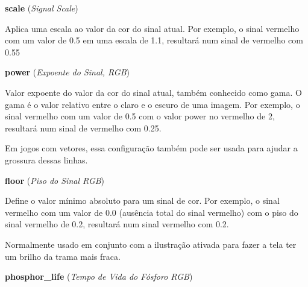 \documentclass[letterpaper,10pt,brazil]{sphinxmanual}
\begin{document}
\begin{DUlineblock}{0em}
\item[] \textbf{scale} (\emph{Signal Scale})
\item[] 
\item[]
\begin{DUlineblock}{\DUlineblockindent}
\item[] Aplica uma escala ao valor da cor do sinal atual. Por exemplo, o sinal vermelho com um valor de 0.5 em uma escala de 1.1, resultará num sinal de vermelho com 0.55
\item[] 
\end{DUlineblock}
\item[] \textbf{power} (\emph{Expoente do Sinal, RGB})
\item[] 
\item[]
\begin{DUlineblock}{\DUlineblockindent}
\item[] Valor expoente do valor da cor do sinal atual, também conhecido como gama. O gama é o valor relativo entre o claro e o escuro de uma imagem. Por exemplo, o sinal vermelho com um valor de 0.5 com o valor power no vermelho de 2, resultará num sinal de vermelho com 0.25.
\item[] 
\item[] Em jogos com vetores, essa configuração também pode ser usada para ajudar a grossura dessas linhas.
\item[] 
\end{DUlineblock}
\item[] \textbf{floor} (\emph{Piso do Sinal RGB})
\item[] 
\item[]
\begin{DUlineblock}{\DUlineblockindent}
\item[] Define o valor mínimo absoluto para um sinal de cor. Por exemplo, o sinal vermelho com um valor de 0.0 (ausência total do sinal vermelho) com o piso do sinal vermelho de 0.2, resultará num sinal vermelho com 0.2.
\item[] 
\item[] Normalmente usado em conjunto com a ilustração ativada para fazer a tela ter um brilho da trama mais fraca.
\item[] 
\end{DUlineblock}
\item[] \textbf{phosphor\_life} (\emph{Tempo de Vida do Fósforo RGB})
\item[] 
\item[]
\begin{DUlineblock}{\DUlineblockindent}

\end{DUlineblock}
\end{DUlineblock}
\end{document}
